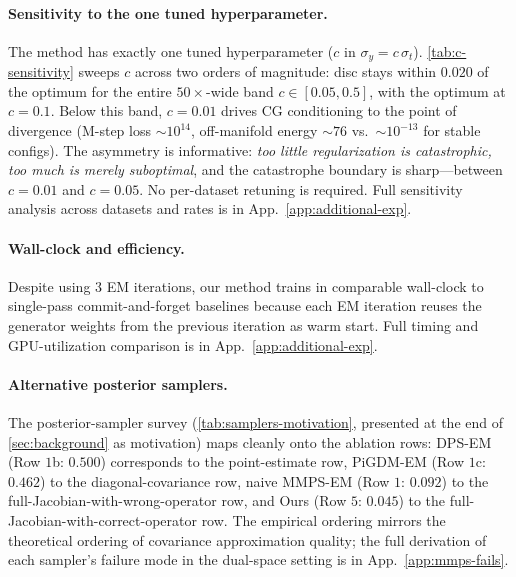 \documentclass{article}
\theoremstyle{plain}
\theoremstyle{definition}
\theoremstyle{remark}
\begin{document}
\paragraph{Sensitivity to the one tuned hyperparameter.}
The method has exactly one tuned hyperparameter ($c$ in $\sigma_y = c\,\sigma_t$). \cref{tab:c-sensitivity} sweeps $c$ across two orders of magnitude: disc stays within $0.020$ of the optimum for the entire $50\times$-wide band $c \in [0.05, 0.5]$, with the optimum at $c = 0.1$. Below this band, $c = 0.01$ drives CG conditioning to the point of divergence (M-step loss ${\sim}10^{14}$, off-manifold energy $\sim 76$ vs.\ $\sim 10^{-13}$ for stable configs). The asymmetry is informative: \emph{too little regularization is catastrophic, too much is merely suboptimal}, and the catastrophe boundary is sharp---between $c = 0.01$ and $c = 0.05$. No per-dataset retuning is required. Full sensitivity analysis across datasets and rates is in App.~\ref{app:additional-exp}.

\paragraph{Wall-clock and efficiency.}
Despite using $3$ EM iterations, our method trains in comparable wall-clock to single-pass commit-and-forget baselines because each EM iteration reuses the generator weights from the previous iteration as warm start. Full timing and GPU-utilization comparison is in App.~\ref{app:additional-exp}.

\vspace{-1mm}
\paragraph{Alternative posterior samplers.}
The posterior-sampler survey (\cref{tab:samplers-motivation}, presented at the end of \cref{sec:background} as motivation) maps cleanly onto the ablation rows: DPS-EM (Row $1$b: $0.500$) corresponds to the point-estimate row, PiGDM-EM (Row $1$c: $0.462$) to the diagonal-covariance row, naive MMPS-EM (Row $1$: $0.092$) to the full-Jacobian-with-wrong-operator row, and Ours (Row $5$: $0.045$) to the full-Jacobian-with-correct-operator row. The empirical ordering mirrors the theoretical ordering of covariance approximation quality; the full derivation of each sampler's failure mode in the dual-space setting is in App.~\ref{app:mmps-fails}.
\end{document}
